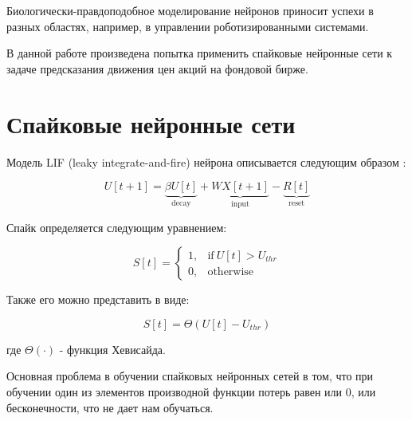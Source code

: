 \documentclass[a4paper,fontsize=12pt,titlepage,final]{scrartcl}
\begin{document}
Биологически-правдоподобное моделирование нейронов приносит успехи в разных областях, например, в управлении роботизированными системами.

В данной работе произведена попытка применить спайковые нейронные сети к задаче предсказания движения цен акций на фондовой бирже.

\section{Спайковые нейронные сети}

Модель LIF (leaky integrate-and-fire) нейрона описывается следующим образом \cite{snntorch} \cite{snntraining}:

$$ U[t+1] = \underbrace{\beta U[t]}_\text{decay} + \underbrace{WX[t+1]}_\text{input} - \underbrace{R[t]}_\text{reset} $$

Спайк определяется следующим уравнением:

$$
S[t] = \begin{cases} 1, &\text{if}~U[t] > U_{thr} \\ 
0, &\text{otherwise}\end{cases}
$$

Также его можно представить в виде:

$$ S[t] = \Theta(U[t] - U_{thr}) $$

где $\Theta(\cdot)$ - функция Хевисайда.

\begin{figure}[!h]
\label{ris:spike_descrip}
\end{figure}

Основная проблема в обучении спайковых нейронных сетей в том, что при обучении один из элементов производной функции потерь равен или 0, или бесконечности, что не дает нам обучаться.
\end{document}
